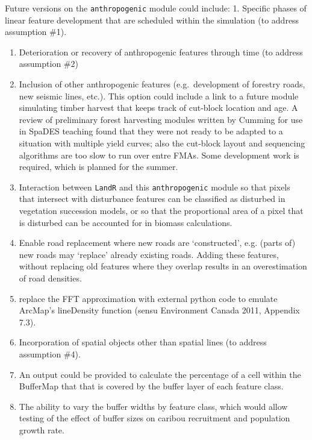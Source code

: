 \documentclass[]{article}
\begin{document}
Future versions on the \texttt{anthropogenic} module could include: 1.
Specific phases of linear feature development that are scheduled within
the simulation (to address assumption \#1).

\begin{enumerate}
\def\labelenumi{\arabic{enumi}.}
\setcounter{enumi}{1}
\item
  Deterioration or recovery of anthropogenic features through time (to
  address assumption \#2)
\item
  Inclusion of other anthropogenic features (e.g.~development of
  forestry roads, new seismic lines, etc.). This option could include a
  link to a future module simulating timber harvest that keeps track of
  cut-block location and age. A review of preliminary forest harvesting
  modules written by Cumming for use in SpaDES teaching found that they
  were not ready to be adapted to a situation with multiple yield
  curves; also the cut-block layout and sequencing algorithms are too
  slow to run over entre FMAs. Some development work is required, which
  is planned for the summer.
\item
  Interaction between \texttt{LandR} and this \texttt{anthropogenic}
  module so that pixels that intersect with disturbance features can be
  classified as disturbed in vegetation succession models, or so that
  the proportional area of a pixel that is disturbed can be accounted
  for in biomass calculations.
\item
  Enable road replacement where new roads are `constructed', e.g. (parts
  of) new roads may `replace' already existing roads. Adding these
  features, without replacing old features where they overlap results in
  an overestimation of road densities.
\item
  replace the FFT approximation with external python code to emulate
  ArcMap's lineDensity function (sensu Environment Canada 2011, Appendix
  7.3).
\item
  Incorporation of spatial objects other than spatial lines (to address
  assumption \#4).
\item
  An output could be provided to calculate the percentage of a cell
  within the BufferMap that that is covered by the buffer layer of each
  feature class.
\item
  The ability to vary the buffer widths by feature class, which would
  allow testing of the effect of buffer sizes on caribou recruitment and
  population growth rate.
\end{enumerate}
\end{document}
